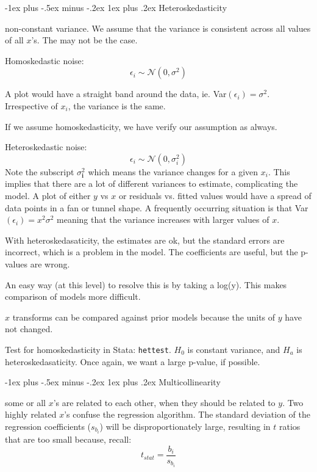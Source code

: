 \documentclass[10pt,landscape]{article}
\makeatletter
\renewcommand{\subsubsection}{\@startsection{subsubsection}{3}{0mm}%
                                {-1ex plus -.5ex minus -.2ex}%
                                {1ex plus .2ex}%
                                {\normalfont\small\bfseries}}
\makeatother
\begin{document}
\begin{multicols*}{3}
\subsubsection{Heteroskedasticity}

non-constant variance. We assume that the variance is consistent across all values of all $x$'s. The may not be the case.

Homoskedastic noise:
\[
\epsilon_i \sim \mathcal{N}(0,\sigma^2)
\]

A plot would have a straight band around the data, ie. Var$(\epsilon_i) = \sigma^2$. Irrespective of $x_i$, the variance is the same.

If we assume homoskedasticity, we have verify our assumption as always.

Heteroskedastic noise:
\[
\epsilon_i \sim \mathcal{N}(0,\sigma^2_i)
\]
Note the subscript $\sigma^2_\textbf{i}$ which means the variance changes for a given $x_i$. This implies that there are a lot of different variances to estimate, complicating the model. A plot of either $y$ vs $x$ or residuals vs. fitted values would have a spread of data points in a fan or tunnel shape. A frequently occurring situation is that Var$(\epsilon_i) = x^2\sigma^2$ meaning that the variance increases with larger values of $x$.

With heteroskedasaticity, the estimates are ok, but the standard errors are incorrect, which is a problem in the model. The coefficients are useful, but the p-values are wrong.

An easy way (at this level) to resolve this is by taking a log(y). This makes comparison of models more difficult.

$x$ transforms can be compared against prior models because the units of $y$ have not changed.

Test for homoskedasticity in Stata: \texttt{hettest}. $H_0$ is constant variance, and $H_a$ is heteroskedasaticity. Once again, we want a large p-value, if possible.

\subsubsection{Multicollinearity}

some or all $x$'s are related to each other, when they should be related to $y$. Two highly related $x$'s  confuse the regression algorithm. The standard deviation of the regression coefficients ($s_{b_i}$) will be disproportionately large, resulting in $t$ ratios that are too small because, recall:
\[
t_{stat} = \frac{b_i} {s_{b_i}}
\]


\end{multicols*}
\end{document}
